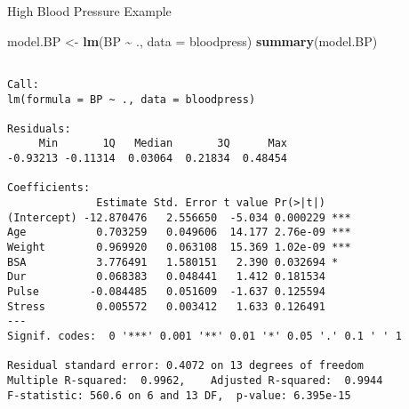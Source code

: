 \documentclass[
  ignorenonframetext,
]{beamer}
\newenvironment{Shaded}{\begin{snugshade}}{\end{snugshade}}
\newcommand{\AttributeTok}[1]{\textcolor[rgb]{0.13,0.29,0.53}{#1}}
\newcommand{\FunctionTok}[1]{\textcolor[rgb]{0.13,0.29,0.53}{\textbf{#1}}}
\newcommand{\NormalTok}[1]{#1}
\newcommand{\OtherTok}[1]{\textcolor[rgb]{0.56,0.35,0.01}{#1}}
\newcommand{\SpecialCharTok}[1]{\textcolor[rgb]{0.81,0.36,0.00}{\textbf{#1}}}
\begin{document}
\begin{frame}[fragile]{High Blood Pressure Example}
\protect\hypertarget{high-blood-pressure-example-2}{}
\scriptsize

\begin{Shaded}
\begin{Highlighting}[]
\NormalTok{model.BP }\OtherTok{\textless{}{-}} \FunctionTok{lm}\NormalTok{(BP }\SpecialCharTok{\textasciitilde{}}\NormalTok{ ., }\AttributeTok{data =}\NormalTok{ bloodpress)}
\FunctionTok{summary}\NormalTok{(model.BP)}
\end{Highlighting}
\end{Shaded}

\begin{verbatim}

Call:
lm(formula = BP ~ ., data = bloodpress)

Residuals:
     Min       1Q   Median       3Q      Max 
-0.93213 -0.11314  0.03064  0.21834  0.48454 

Coefficients:
              Estimate Std. Error t value Pr(>|t|)    
(Intercept) -12.870476   2.556650  -5.034 0.000229 ***
Age           0.703259   0.049606  14.177 2.76e-09 ***
Weight        0.969920   0.063108  15.369 1.02e-09 ***
BSA           3.776491   1.580151   2.390 0.032694 *  
Dur           0.068383   0.048441   1.412 0.181534    
Pulse        -0.084485   0.051609  -1.637 0.125594    
Stress        0.005572   0.003412   1.633 0.126491    
---
Signif. codes:  0 '***' 0.001 '**' 0.01 '*' 0.05 '.' 0.1 ' ' 1

Residual standard error: 0.4072 on 13 degrees of freedom
Multiple R-squared:  0.9962,    Adjusted R-squared:  0.9944 
F-statistic: 560.6 on 6 and 13 DF,  p-value: 6.395e-15
\end{verbatim}

\normalsize
\end{frame}
\end{document}
